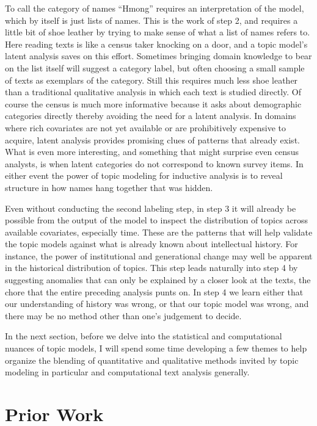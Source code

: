 \documentclass[]{book}
\begin{document}
To call the category of names ``Hmong'' requires an interpretation of
the model, which by itself is just lists of names. This is the work of
step 2, and requires a little bit of shoe leather by trying to make
sense of what a list of names refers to. Here reading texts is like a
census taker knocking on a door, and a topic model's latent analysis
saves on this effort. Sometimes bringing domain knowledge to bear on the
list itself will suggest a category label, but often choosing a small
sample of texts as exemplars of the category. Still this requires much
less shoe leather than a traditional qualitative analysis in which each
text is studied directly. Of course the census is much more informative
because it asks about demographic categories directly thereby avoiding
the need for a latent analysis. In domains where rich covariates are not
yet available or are prohibitively expensive to acquire, latent analysis
provides promising clues of patterns that already exist. What is even
more interesting, and something that might surprise even census
analysts, is when latent categories do not correspond to known survey
items. In either event the power of topic modeling for inductive
analysis is to reveal structure in how names hang together that was
hidden.

Even without conducting the second labeling step, in step 3 it will
already be possible from the output of the model to inspect the
distribution of topics across available covariates, especially time.
These are the patterns that will help validate the topic models against
what is already known about intellectual history. For instance, the
power of institutional and generational change may well be apparent in
the historical distribution of topics. This step leads naturally into
step 4 by suggesting anomalies that can only be explained by a closer
look at the texts, the chore that the entire preceding analysis punts
on. In step 4 we learn either that our understanding of history was
wrong, or that our topic model was wrong, and there may be no method
other than one's judgement to decide.

In the next section, before we delve into the statistical and
computational nuances of topic models, I will spend some time developing
a few themes to help organize the blending of quantitative and
qualitative methods invited by topic modeling in particular and
computational text analysis generally.

\chapter{Prior Work}\label{kd-lit}
\end{document}
